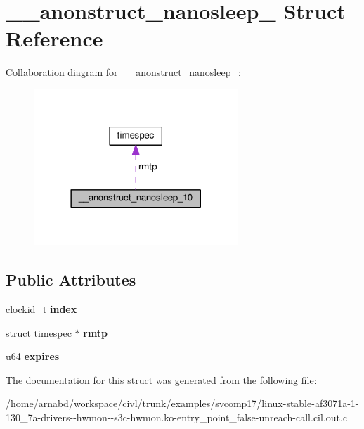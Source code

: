 \hypertarget{struct____anonstruct__nanosleep__10}{}\section{\+\_\+\+\_\+anonstruct\+\_\+nanosleep\+\_ Struct Reference}
\label{struct____anonstruct__nanosleep__10}


Collaboration diagram for \+\_\+\+\_\+anonstruct\+\_\+nanosleep\+\_\+:
\nopagebreak
\begin{figure}[H]
\begin{center}
\leavevmode
\includegraphics[width=218pt]{struct____anonstruct__nanosleep__10__coll__graph}
\end{center}
\end{figure}
\subsection*{Public Attributes}
\begin{DoxyCompactItemize}
\item 
\hypertarget{struct____anonstruct__nanosleep__10_ae89fe96ab4588101d9465b0d6cd15bee}{}clockid\+\_\+t {\bfseries index}\label{struct____anonstruct__nanosleep__10_ae89fe96ab4588101d9465b0d6cd15bee}

\item 
\hypertarget{struct____anonstruct__nanosleep__10_a4318dcfa05555790b6d58ab49073a24f}{}struct \hyperlink{structtimespec}{timespec} $\ast$ {\bfseries rmtp}\label{struct____anonstruct__nanosleep__10_a4318dcfa05555790b6d58ab49073a24f}

\item 
\hypertarget{struct____anonstruct__nanosleep__10_adcecfc77ec1e2b1d3334a44bce9de397}{}u64 {\bfseries expires}\label{struct____anonstruct__nanosleep__10_adcecfc77ec1e2b1d3334a44bce9de397}

\end{DoxyCompactItemize}


The documentation for this struct was generated from the following file\+:\begin{DoxyCompactItemize}
\item 
/home/arnabd/workspace/civl/trunk/examples/svcomp17/linux-\/stable-\/af3071a-\/1-\/130\+\_\+7a-\/drivers-\/-\/hwmon-\/-\/s3c-\/hwmon.\+ko-\/entry\+\_\+point\+\_\+false-\/unreach-\/call.\+cil.\+out.\+c\end{DoxyCompactItemize}
